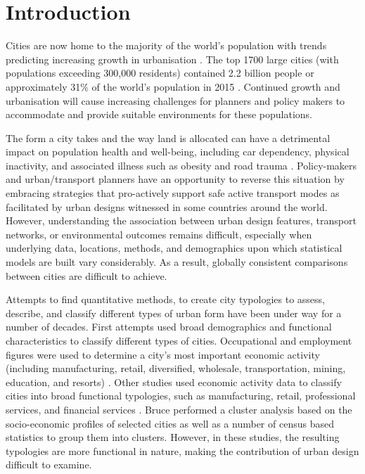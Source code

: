 \documentclass[Crown,sageh,times]{sagej}
\begin{document}
\maketitle



\section{Introduction}\label{sec:introduction}

Cities are now home to the majority of the world's population with trends predicting increasing growth in urbanisation \cite{UNDESA2015,WHO2016,ABS2008}. The top 1700 large cities (with populations exceeding 300,000 residents) contained 2.2 billion people or approximately 31\% of the world's population in 2015 \cite{UN2014}. Continued growth and urbanisation will cause increasing challenges for planners and policy makers to accommodate and provide suitable environments for these populations.

The form a city takes and the way land is allocated can have a detrimental impact on population health and well-being, including car dependency, physical inactivity, and associated illness such as obesity and road trauma \cite{Giles-corti2016,Kleinert2016,Goenka2016,Zapata-Diomedi2017,Heesch2014,Daley2011, Cepeda2016,MingWen2008,Norman2006,Thompson2018b}. Policy-makers and urban/transport planners have an opportunity to reverse this situation by embracing strategies that pro-actively support safe active transport modes as facilitated by urban designs witnessed in some countries around the world. However, understanding the association between urban design features, transport networks, or environmental outcomes remains difficult, especially when underlying data, locations, methods, and demographics upon which statistical models are built vary considerably. As a result, globally consistent comparisons between cities are difficult to achieve. 

Attempts to find quantitative methods, to create city typologies to assess, describe, and classify different types of urban form have been under way for a number of decades. First attempts used broad demographics and functional characteristics to classify different types of cities. Occupational and employment figures were used to determine a city's most important economic activity (including manufacturing, retail, diversified, wholesale, transportation, mining, education, and resorts) \cite{Harris1943}. Other studies used economic activity data to classify cities into broad functional typologies, such as manufacturing, retail, professional services, and financial services \cite{Nelson1955}. Bruce \cite{Bruce1971} performed a cluster analysis based on the socio-economic profiles of selected cities as well as a number of census based statistics to group them into clusters. However, in these studies, the resulting typologies are more functional in nature, making the contribution of urban design difficult to examine.
\end{document}
